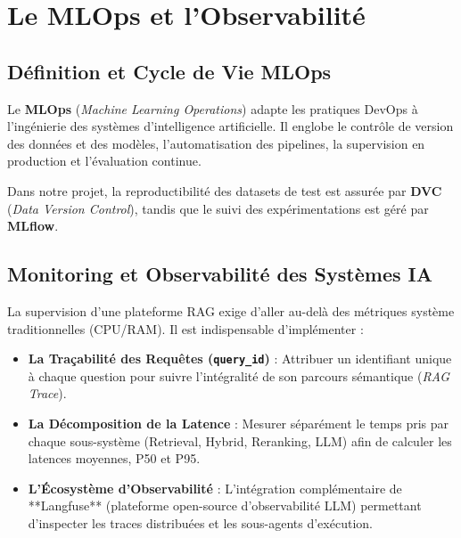 \section{Le MLOps et l'Observabilité}

\subsection{Définition et Cycle de Vie MLOps}
Le \textbf{MLOps} (\textit{Machine Learning Operations}) adapte les pratiques DevOps à l'ingénierie des systèmes d'intelligence artificielle. Il englobe le contrôle de version des données et des modèles, l'automatisation des pipelines, la supervision en production et l'évaluation continue.

Dans notre projet, la reproductibilité des datasets de test est assurée par \textbf{DVC} (\textit{Data Version Control}), tandis que le suivi des expérimentations est géré par \textbf{MLflow}.

\subsection{Monitoring et Observabilité des Systèmes IA}
La supervision d'une plateforme RAG exige d'aller au-delà des métriques système traditionnelles (CPU/RAM). Il est indispensable d'implémenter :
\begin{itemize}
    \item \textbf{La Traçabilité des Requêtes (\texttt{query\_id})} : Attribuer un identifiant unique à chaque question pour suivre l'intégralité de son parcours sémantique (\textit{RAG Trace}).
    \item \textbf{La Décomposition de la Latence} : Mesurer séparément le temps pris par chaque sous-système (Retrieval, Hybrid, Reranking, LLM) afin de calculer les latences moyennes, P50 et P95.
    \item \textbf{L'Écosystème d'Observabilité} : L'intégration complémentaire de **Langfuse** (plateforme open-source d'observabilité LLM) permettant d'inspecter les traces distribuées et les sous-agents d'exécution.
\end{itemize}


